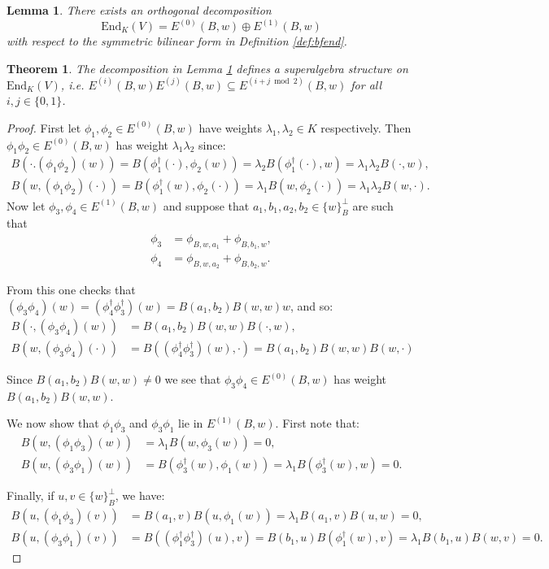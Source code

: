 \documentclass[10pt,a4paper]{amsart}
\newtheorem{lemma}{Lemma}
\newtheorem{theorem}{Theorem}
\begin{document}
\begin{lemma}
\label{lem:decomp}
There exists an orthogonal decomposition \[\text{End}_K(V) = E^{(0)}(B,w)\oplus E^{(1)}(B,w)\] with respect to the symmetric bilinear form in Definition \ref{def:bfend}.
\end{lemma}

\begin{theorem}
\label{thm:superalg}
The decomposition in Lemma \ref{lem:decomp} defines a superalgebra structure on $\text{End}_K(V)$, i.e. $E^{(i)}(B,w)E^{(j)}(B,w) \subseteq E^{(i+j \bmod 2)}(B,w)$ for all $i,j\in\{0,1\}$.
\end{theorem}

\begin{proof}
First let $\phi_1,\phi_2\in E^{(0)}(B,w)$ have weights $\lambda_1, \lambda_2\in K$ respectively. Then $\phi_1\phi_2\in E^{(0)}(B,w)$ has weight $\lambda_1\lambda_2$ since:
\begin{align*}
    B(\cdot. (\phi_1\phi_2)(w)) = B(\phi_1^\dagger(\cdot),\phi_2(w)) = \lambda_2 B(\phi_1^\dagger(\cdot), w) = \lambda_1\lambda_2 B(\cdot, w), \\
    B(w, (\phi_1\phi_2)(\cdot)) = B(\phi_1^\dagger(w),\phi_2(\cdot)) = \lambda_1 B(w,\phi_2(\cdot)) = \lambda_1\lambda_2 B(w,\cdot).
\end{align*}
Now let $\phi_3,\phi_4\in E^{(1)}(B,w)$ and suppose that $a_1, b_1, a_2, b_2\in \{w\}_B^{\perp}$ are such that \begin{align*}\phi_3 &= \phi_{B,w,a_1} + \phi_{B,b_1,w},\\ \phi_4 &= \phi_{B,w,a_2} + \phi_{B,b_2,w}.\end{align*} 

From this one checks that $(\phi_3\phi_4)(w) = (\phi_4^\dagger\phi_3^\dagger)(w) = B(a_1,b_2)B(w,w) w$, and so:
\begin{align*}
    B(\cdot, (\phi_3\phi_4)(w)) &= B(a_1,b_2)B(w,w) B(\cdot,w),\\
    B(w,(\phi_3\phi_4)(\cdot)) &= B((\phi_4^\dagger\phi_3^\dagger)(w),\cdot) = B(a_1,b_2)B(w,w)B(w,\cdot)
\end{align*}

Since $B(a_1,b_2)B(w,w)\neq 0$ we see that $\phi_3\phi_4\in E^{(0)}(B,w)$ has weight $B(a_1,b_2)B(w,w)$.

We now show that $\phi_1\phi_3$ and $\phi_3\phi_1$ lie in $E^{(1)}(B,w)$. First note that:
\begin{align*}
    B(w,(\phi_1\phi_3)(w)) &= \lambda_1 B(w,\phi_3(w)) = 0,\\
    B(w,(\phi_3\phi_1)(w)) &= B(\phi_3^\dagger(w),\phi_1(w)) = \lambda_1 B(\phi_3^\dagger(w),w) = 0.
\end{align*}

Finally, if $u,v\in\{w\}_B^{\perp}$, we have:
\begin{align*}
    B(u,(\phi_1\phi_3)(v)) &= B(a_1,v)B(u,\phi_1(w)) = \lambda_1 B(a_1,v)B(u,w) = 0, \\
    B(u,(\phi_3\phi_1)(v)) &= B((\phi_1^\dagger\phi_3^\dagger)(u),v) = B(b_1,u)B(\phi_1^\dagger(w),v) = \lambda_1 B(b_1,u)B(w,v) = 0.
\end{align*}
\end{proof}
\end{document}
